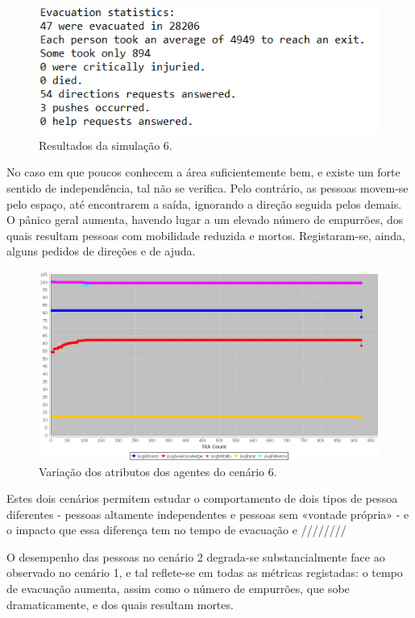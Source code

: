 \documentclass[12pt]{article}
\begin{document}
\begin{titlepage}
\begin{itemize}
\begin{figure}[H]
	\centering
	\includegraphics{log_sc_alt2.png}
	\caption{Resultados da simulação 6.}
	\label{log_sc1}
\end{figure}

No caso em que poucos conhecem a área suficientemente bem, e existe um forte sentido de independência, tal não se verifica. Pelo contrário, as pessoas movem-se pelo espaço, até encontrarem a saída, ignorando a direção seguida pelos demais. O pânico geral aumenta, havendo lugar a um elevado número de empurrões, dos quais resultam pessoas com mobilidade reduzida e mortos. Registaram-se, ainda, alguns pedidos de direções e de ajuda.

\begin{figure}[H]
	\centering
	\includegraphics{graph_sc_alt2.png}
	\caption{Variação dos atributos dos agentes do cenário 6.}
	\label{graph_sc1}
\end{figure}

Estes dois cenários permitem estudar o comportamento de dois tipos de pessoa diferentes - pessoas altamente independentes e pessoas sem «vontade própria» - e o impacto que essa diferença tem no tempo de evacuação e ////////

O desempenho das pessoas no cenário 2 degrada-se substancialmente face ao observado no cenário 1, e tal reflete-se em todas as métricas registadas: o tempo de evacuação aumenta, assim como o número de empurrões, que sobe dramaticamente, e dos quais resultam mortes.


\end{itemize}
\end{titlepage}
\end{document}
